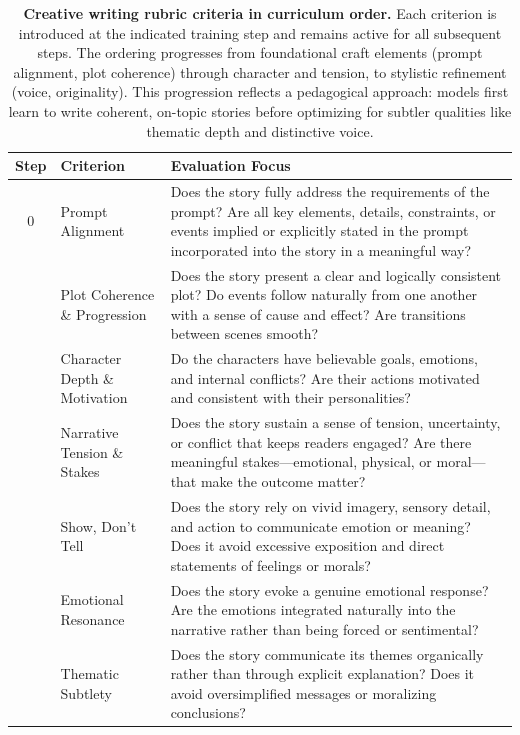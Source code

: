 \documentclass{article}
\theoremstyle{plain}
\theoremstyle{definition}
\theoremstyle{remark}
\begin{document}
\begin{table}[t]
\centering
\small
\caption{\textbf{Creative writing rubric criteria in curriculum order.} Each criterion is introduced at the indicated training step and remains active for all subsequent steps. The ordering progresses from foundational craft elements (prompt alignment, plot coherence) through character and tension, to stylistic refinement (voice, originality). This progression reflects a pedagogical approach: models first learn to write coherent, on-topic stories before optimizing for subtler qualities like thematic depth and distinctive voice.}
\begin{tabular}{clp{10cm}}
\toprule
\textbf{Step} & \textbf{Criterion} & \textbf{Evaluation Focus} \\
\midrule
0 & Prompt Alignment & Does the story fully address the requirements of the prompt? Are all key elements, details, constraints, or events implied or explicitly stated in the prompt incorporated into the story in a meaningful way? \\
\addlinespace
100 & Plot Coherence \& Progression & Does the story present a clear and logically consistent plot? Do events follow naturally from one another with a sense of cause and effect? Are transitions between scenes smooth? \\
\addlinespace
200 & Character Depth \& Motivation & Do the characters have believable goals, emotions, and internal conflicts? Are their actions motivated and consistent with their personalities? \\
\addlinespace
300 & Narrative Tension \& Stakes & Does the story sustain a sense of tension, uncertainty, or conflict that keeps readers engaged? Are there meaningful stakes---emotional, physical, or moral---that make the outcome matter? \\
\addlinespace
400 & Show, Don't Tell & Does the story rely on vivid imagery, sensory detail, and action to communicate emotion or meaning? Does it avoid excessive exposition and direct statements of feelings or morals? \\
\addlinespace
500 & Emotional Resonance & Does the story evoke a genuine emotional response? Are the emotions integrated naturally into the narrative rather than being forced or sentimental? \\
\addlinespace
600 & Thematic Subtlety & Does the story communicate its themes organically rather than through explicit explanation? Does it avoid oversimplified messages or moralizing conclusions? \\

\end{tabular}
\end{table}
\end{document}
